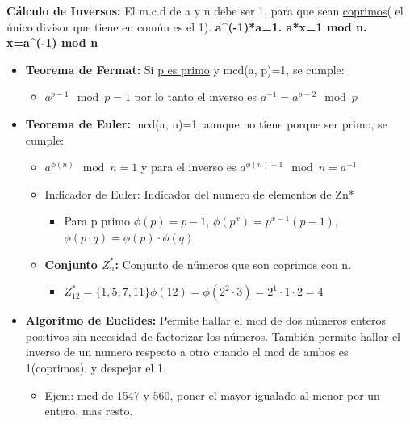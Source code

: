 \documentclass[12pt, twoside, openright]{report} %
\begin{document}
  
  \textbf{Cálculo de Inversos:} El m.c.d de a y n debe ser 1, para que
  sean \underline{coprimos}( el único divisor que tiene en común es el
  1). \textbf{a\^{}(-1)*a=1. a*x=1 mod n. x=a\^{}(-1) mod n}
  

  \begin{itemize}
  \item \textbf{Teorema de Fermat:} Si \underline{p es primo} y mcd(a, p)=1,
    se cumple:
    

    \begin{itemize}
    \item $a^{p-1} \mod p = 1$ por lo tanto el inverso es $a^{-1} = a^{p-2} \mod p$
      
    \end{itemize}
  \item \textbf{Teorema de Euler:} mcd(a, n)=1, aunque no tiene porque ser
    primo, se cumple:
    

    \begin{itemize}
    \item $a^{\phi(n)} \mod n = 1$ y para el inverso es $a^{\phi(n)-1} \mod n = a^{-1}$
      
    \item Indicador de Euler: Indicador del numero de elementos de Zn*
    \begin{itemize}
		\item Para p primo $\phi(p)=p-1$, $\phi(p^x)=p^{x-1}(p-1)$, $\phi(p\cdot q) = \phi(p)\cdot\phi(q)$
	\end{itemize}
      
    \item \textbf{Conjunto $Z_n^*$:} Conjunto de números que son coprimos con n.
      

      \begin{itemize}
      \item
        
		$Z_{1 2}^* = \{ 1, 5, 7, 11\} \phi(12) = \phi(2^2\cdot 3)=2^1 \cdot 1 \cdot 2 = 4$
        
      \end{itemize}
    \end{itemize}
  \item \textbf{Algoritmo de Euclides:} Permite hallar el mcd de dos números
    enteros positivos sin necesidad de factorizar los números. También
    permite hallar el inverso de un numero respecto a otro cuando el mcd
    de ambos es 1(coprimos), y despejar el 1.
    

    \begin{itemize}
    \item Ejem: mcd de 1547 y 560, poner el mayor igualado al menor por un
      entero, mas resto.
      

\end{itemize}
\end{itemize}
\end{document}
